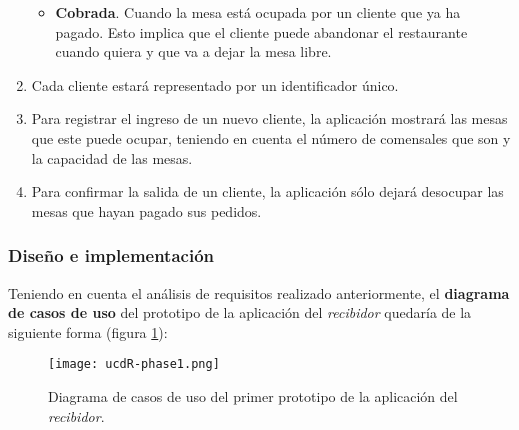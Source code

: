 \begin{enumerate}
\begin{itemize}
  \item \textbf{Cobrada}. Cuando la mesa está ocupada por un cliente que ya
  ha pagado. Esto implica que el cliente puede abandonar el restaurante
  cuando quiera y que va a dejar la mesa libre.
  \end{itemize}
\item Cada cliente estará representado por un identificador único.
\item Para registrar el ingreso de un nuevo cliente, la aplicación mostrará
las mesas que este puede ocupar, teniendo en cuenta el número de comensales que
son y la capacidad de las mesas.
\item Para confirmar la salida de un cliente, la aplicación sólo dejará
desocupar las mesas que hayan pagado sus pedidos.
\end{enumerate}

\subsubsection{Diseño e implementación}
Teniendo en cuenta el análisis de requisitos realizado anteriormente, el
\textbf{diagrama de casos de uso} del prototipo de la aplicación del
\emph{recibidor} quedaría de la siguiente forma (figura \ref{fig:ucdR-phase1}):

  \begin{figure}[H]
    \begin{center}
      \texttt{[image: ucdR-phase1.png]}
      \caption{Diagrama de casos de uso del primer prototipo de la aplicación
      del \emph{recibidor}.}
      \label{fig:ucdR-phase1}
    \end{center}
  \end{figure}

